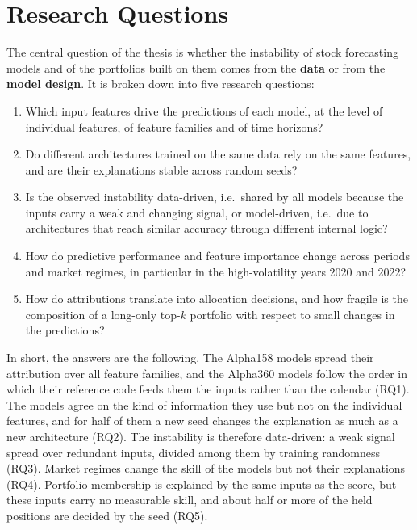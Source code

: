 \section{Research Questions}
\label{sec:intro_questions}

The central question of the thesis is whether the instability of stock forecasting models and of the portfolios built on them comes from the \textbf{data} or from the \textbf{model design}. It is broken down into five research questions:
\begin{enumerate}[label=\textbf{RQ\arabic*}, leftmargin=*, noitemsep]
    \item \label{rq:features} Which input features drive the predictions of each model, at the level of individual features, of feature families and of time horizons?
    \item \label{rq:agreement} Do different architectures trained on the same data rely on the same features, and are their explanations stable across random seeds?
    \item \label{rq:diagnosis} Is the observed instability data-driven, i.e.\ shared by all models because the inputs carry a weak and changing signal, or model-driven, i.e.\ due to architectures that reach similar accuracy through different internal logic?
    \item \label{rq:periods} How do predictive performance and feature importance change across periods and market regimes, in particular in the high-volatility years 2020 and 2022?
    \item \label{rq:allocation} How do attributions translate into allocation decisions, and how fragile is the composition of a long-only top-$k$ portfolio with respect to small changes in the predictions?
\end{enumerate}

In short, the answers are the following. The Alpha158 models spread their attribution over all feature families, and the Alpha360 models follow the order in which their reference code feeds them the inputs rather than the calendar (RQ1). The models agree on the kind of information they use but not on the individual features, and for half of them a new seed changes the explanation as much as a new architecture (RQ2). The instability is therefore data-driven: a weak signal spread over redundant inputs, divided among them by training randomness (RQ3). Market regimes change the skill of the models but not their explanations (RQ4). Portfolio membership is explained by the same inputs as the score, but these inputs carry no measurable skill, and about half or more of the held positions are decided by the seed (RQ5).

